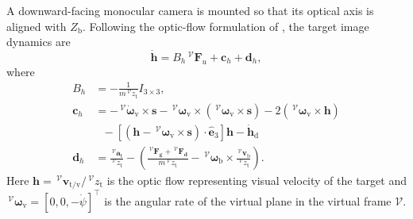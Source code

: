 A downward-facing monocular camera is mounted so that its optical axis is aligned with $Z_\text{b}$. Following the optic-flow formulation of \cite{herisse2012}, the target image dynamics are
\begin{equation}
    \dot{\boldsymbol{h}} = B_h \,^\mathcal{V} \boldsymbol{F}_u + \boldsymbol{c}_h + \boldsymbol{d}_h,
\end{equation}
where 
\begin{align*}
    B_h &= - \frac{1}{m \,^\mathcal{V} z_{\text{t}}} I_{3 \times 3}, \\
    \boldsymbol{c}_h &=  - \,^\mathcal{V}\dot{\boldsymbol{\omega}}_{\text{v}} \times \boldsymbol{s} - \,^\mathcal{V}\boldsymbol{\omega}_{\text{v}} \times \left(\,^\mathcal{V} \boldsymbol{\omega}_{\text{v}} \times \boldsymbol{s} \right) - 2 \left(\,^\mathcal{V} \boldsymbol{\omega}_{\text{v}} \times \boldsymbol{h} \right) \nonumber \\
    &~~~ - \left[\left( \boldsymbol{h} - \,^\mathcal{V}\boldsymbol{\omega}_{\text{v}} \times \boldsymbol{s} \right) \cdot \hat{\boldsymbol{e}}_3 \right] \boldsymbol{h} - \dot{\boldsymbol{h}}_\text{d} \\
    \boldsymbol{d}_h &= \frac{\,^\mathcal{V}\boldsymbol{a}_{\text{t}}}{\,^\mathcal{V}z_{\text{t}}} - \left(\frac{\,^\mathcal{V}\boldsymbol{F_{\text{g}}} + \,^\mathcal{V}\boldsymbol{F_{\text{d}}}}{m \,^\mathcal{V}z_{\text{t}}} - \,^\mathcal{V}\boldsymbol{\omega}_{\text{b}} \times \frac{\,^\mathcal{V}\boldsymbol{v}_{\text{b}}}{\,^\mathcal{V}z_{\text{t}}} \right).
\end{align*}
Here $\boldsymbol{h} = \,^\mathcal{V} \boldsymbol{v}_{\text{t/v}}/\,^\mathcal{V} z_{\text{t}}$ is the optic flow representing visual velocity of the target and  $\,^\mathcal{V} \boldsymbol{\omega}_{\text{v}} = [0, 0, -\dot{\psi}]^\top$ is the angular rate of the virtual plane in the virtual frame $\mathcal{V}$.
 
